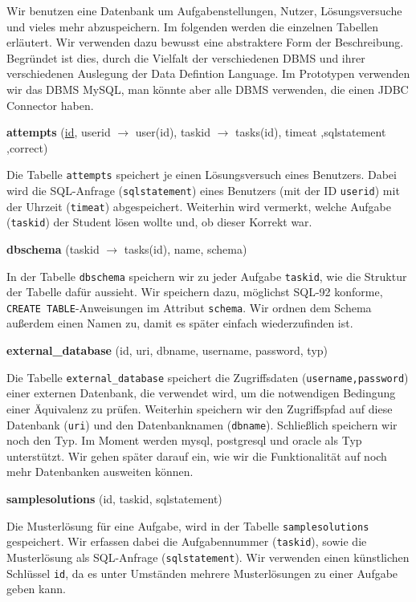 Wir benutzen eine Datenbank um Aufgabenstellungen, Nutzer, Lösungsversuche und vieles mehr abzuspeichern. Im folgenden werden die einzelnen Tabellen erläutert. Wir verwenden dazu bewusst eine abstraktere Form der Beschreibung. Begründet ist dies, durch die Vielfalt der verschiedenen DBMS und ihrer verschiedenen Auslegung der Data Defintion Language. Im Prototypen verwenden wir das DBMS MySQL, man könnte aber alle DBMS verwenden, die einen JDBC Connector haben.

\textbf{attempts} (\underline{id}, userid $\to$ user(id), taskid $\to$ tasks(id), timeat ,sqlstatement ,correct)

Die Tabelle \verb|attempts| speichert je einen Lösungsversuch eines Benutzers. Dabei wird die SQL-Anfrage (\verb|sqlstatement|) eines Benutzers (mit der ID \verb|userid|) mit der Uhrzeit (\verb|timeat|) abgespeichert. Weiterhin wird vermerkt, welche Aufgabe (\verb|taskid|) der Student lösen wollte und, ob dieser Korrekt war.

\textbf{dbschema} (taskid $\to$ tasks(id), name, schema)

In der Tabelle \verb|dbschema| speichern wir zu jeder Aufgabe \verb|taskid|, wie die Struktur der Tabelle dafür aussieht. Wir speichern dazu, möglichst SQL-92 konforme, \verb|CREATE TABLE|-Anweisungen im Attribut \verb|schema|. Wir ordnen dem Schema außerdem einen Namen zu, damit es später einfach wiederzufinden ist.

\textbf{external\_database} (id, uri, dbname, username, password, typ)

Die Tabelle \verb|external_database| speichert die Zugriffsdaten (\verb|username,password|) einer externen Datenbank, die verwendet wird, um die notwendigen Bedingung einer Äquivalenz zu prüfen. Weiterhin speichern wir den Zugriffspfad auf diese Datenbank (\verb|uri|) und den Datenbanknamen (\verb|dbname|). Schließlich speichern wir noch den Typ. Im Moment werden mysql, postgresql und oracle als Typ unterstützt. Wir gehen später darauf ein, wie wir die Funktionalität auf noch mehr Datenbanken ausweiten können.

\textbf{samplesolutions} (id, taskid, sqlstatement)

Die Musterlösung für eine Aufgabe, wird in der Tabelle \verb|samplesolutions| gespeichert. Wir erfassen dabei die Aufgabennummer (\verb|taskid|), sowie die Musterlösung als SQL-Anfrage (\verb|sqlstatement|). Wir verwenden einen künstlichen Schlüssel \verb|id|, da es unter Umständen mehrere Musterlösungen zu einer Aufgabe geben kann.

